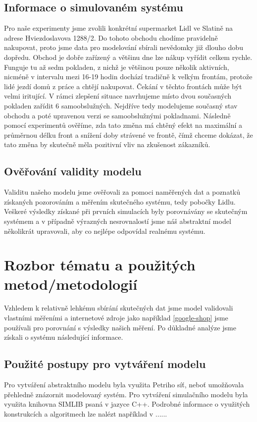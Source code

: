 \documentclass[12pt,a4paper,titlepage]{article}
\begin{document}
\subsection{Informace o simulovaném systému}
Pro naše experimenty jsme zvolili konkrétní supermarket Lidl ve Slatině na adrese Hviezdoslavova 1288/2. Do tohoto obchodu chodíme pravidelně nakupovat, proto jsme data pro modelování sbírali nevědomky již dlouho dobu dopředu. Obchod je dobře zařízený a většinu dne lze nákup vyřídit celkem rychle. Funguje tu až sedm pokladen, z nichž je většinou pouze několik aktivních, nicméně v intervalu mezi 16-19 hodin dochází tradičně k velkým frontám, protože lidé jezdí domů z práce a chtějí nakupovat. Čekání v těchto frontách může být velmi iritující. V rámci zlepšení situace  navrhujeme místo dvou současných pokladen zařídit 6 samoobslužných. Nejdříve tedy modelujeme současný stav obchodu a poté upravenou verzi se samoobslužnými pokladnami. Následně pomocí experimentů ověříme, zda tato změna má chtěný efekt na maximální a průměrnou délku front a snížení doby strávené ve frontě, čímž chceme dokázat, že tato změna by skutečně měla pozitivní vliv na zkušenost zákazníků.
\subsection{Ověřování validity modelu}
Validitu našeho modelu jsme ověřovali za pomoci naměřených dat a poznatků získaných pozorováním a měřením skutečného systému, tedy pobočky Lidlu. Veškeré výsledky získané při prvních simulacích byly porovnávány se skutečným systémem a v případně výrazných nesrovnalostí jsme náš abstraktní model několikrát upravovali, aby co nejlépe odpovídal realnému systému.
\section{Rozbor tématu a použitých metod/metodologií}
Vzhledem k relativně lehkému sbírání skutečných dat jsme model validovali vlastními měřeními a internetové zdroje jako například \ref{google-shop} jsme používali pro porovnání s výsledky našich měření. Po důkladné analýze jsme získali o systému následující informace. 

\subsection{Použité postupy pro vytváření modelu}
Pro vytváření abstraktního modelu byla využita Petriho síť, neboť umožňovala přehledně znázornit modelovaný systém. Pro vytváření simulačního modelu byla využita knihovna SIMLIB psaná v jazyce C++. Podrobné informace o využitých konstrukcích a algoritmech lze nalézt například v ......
\end{document}
